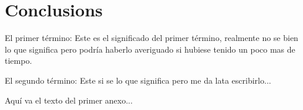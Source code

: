 \documentclass{iccmemoria}
\begin{document}
\chapter{Conclusions}





\begin{glosario}
  \item[El primer término:] Este es el significado del primer término, realmente no se bien lo que significa pero podría haberlo averiguado si hubiese tenido un poco mas de tiempo.
  \item[El segundo término:] Este si se lo que significa pero me da lata escribirlo...
\end{glosario}





\appendixpart

Aquí va el texto del primer anexo...

\end{document}
